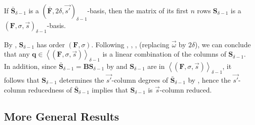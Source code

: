 \begin{lem}
\label{lem:delta-1Basis}If $\bar{\mathbf{S}}_{\delta-1}$ is a $(\bar{\mathbf{F}},2\delta,\vec{s'})_{\delta-1}$-basis,
then the matrix of its first $n$ rows $\mathbf{S}_{\delta-1}$ is
a $\left(\mathbf{F},\sigma,\vec{s}\right)_{\delta-1}$-basis.\end{lem}
\begin{pf}
By , $\mathbf{S}_{\delta-1}$ has order
$\left(\mathbf{F},\sigma\right)$. Following ,
, , 
(replacing $\vec{\omega}$ by $2\delta$), we can conclude that any
$\mathbf{q}\in\left\langle \left(\mathbf{F},\sigma,\vec{s}\right)\right\rangle _{\delta-1}$
is a linear combination of the columns of $\mathbf{S}_{\delta-1}$.
In addition, since $\bar{\mathbf{S}}_{\delta-1}=\mathbf{B}\mathbf{S}_{\delta-1}$
by  and $\mathbf{S}_{\delta-1}$ are
in $\left\langle \left(\mathbf{F},\sigma,\vec{s}\right)\right\rangle _{\delta-1}$,
it follows that $\mathbf{S}_{\delta-1}$ determines the $\vec{s'}$-column
degrees of $\bar{\mathbf{S}}_{\delta-1}$ by ,
hence the $\vec{s'}$-column reducedness of $\bar{\mathbf{S}}_{\delta-1}$
implies that $\mathbf{S}_{\delta-1}$ is $\vec{s}$-column reduced. 
\end{pf}

\subsection{\label{sub:generalTransform}More General Results}

